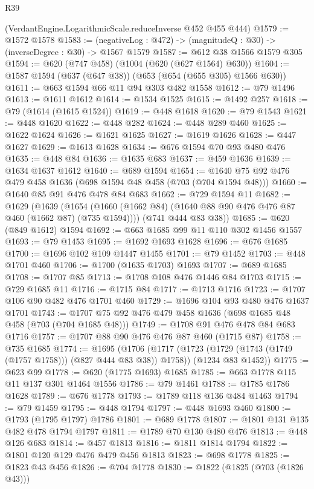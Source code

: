 \begin{lexlean}{R39}
\begin{coremodule}
    (VerdantEngine.LogarithmicScale.reduceInverse @452 @455 @444)
@1579 := @1572 @1578
@1583 := (negativeLog : @472) -> (magnitudeQ : @30) -> (inverseDegree : @30) -> @1567 @1579
@1587 := @612 @38 @1566 @1579 @305
@1594 := @620 (@747 @458) (@1004 (@620 (@627 @1564) @630))
@1604 := @1587 @1594 (@637 (@647 @38)) (@653 (@654 (@655 @305) @1566 @630))
@1611 := @663 @1594 @66 @11 @94 @303 @482 @1558
@1612 := @79 @1496
@1613 := @1611 @1612
@1614 := @1534 @1525
@1615 := @1492 @257
@1618 := @79 (@1614 (@1615 @1524))
@1619 := @448 @1618
@1620 := @79 @1543
@1621 := @448 @1620
@1622 := @448 @282
@1624 := @448 @289 @460
@1625 := @1622 @1624
@1626 := @1621 @1625
@1627 := @1619 @1626
@1628 := @447 @1627
@1629 := @1613 @1628
@1634 := @676 @1594 @70 @93 @480 @476
@1635 := @448 @84
@1636 := @1635 @683
@1637 := @459 @1636
@1639 := @1634 @1637 @1612
@1640 := @689 @1594
@1654 := @1640 @75 @92 @476 @479 @458 @1636 (@698 @1594 @48 @458 (@703 (@704 @1594 @48)))
@1660 := @1640 @85 @91 @476 @478 @84 @683
@1662 := @729 @1594 @11
@1682 := @1629
    (@1639
      (@1654 (@1660 (@1662 @84) (@1640 @88 @90 @476 @476 @87 @460 (@1662 @87) (@735 @1594))))
      (@741 @444 @83 @38))
@1685 := @620 (@849 @1612) @1594
@1692 := @663 @1685 @99 @11 @110 @302 @1456 @1557
@1693 := @79 @1453
@1695 := @1692 @1693 @1628
@1696 := @676 @1685
@1700 := @1696 @102 @109 @1447 @1455
@1701 := @79 @1452
@1703 := @448 @1701 @460
@1706 := @1700 (@1635 @1703) @1693
@1707 := @689 @1685
@1708 := @1707 @85
@1713 := @1708 @108 @476 @1446 @84 @1703
@1715 := @729 @1685 @11
@1716 := @1715 @84
@1717 := @1713 @1716
@1723 := @1707 @106 @90 @482 @476 @1701 @460
@1729 := @1696 @104 @93 @480 @476 @1637 @1701
@1743 := @1707 @75 @92 @476 @479 @458 @1636 (@698 @1685 @48 @458 (@703 (@704 @1685 @48)))
@1749 := @1708 @91 @476 @478 @84 @683 @1716
@1757 := @1707 @88 @90 @476 @476 @87 @460 (@1715 @87)
@1758 := @735 @1685
@1774 := @1695
    (@1706
      (@1717 (@1723 (@1729 (@1743 (@1749 (@1757 @1758))) (@827 @444 @83 @38)) @1758))
      (@1234 @83 @1452))
@1775 := @623 @99
@1778 := @620 (@1775 @1693) @1685
@1785 := @663 @1778 @115 @11 @137 @301 @1464 @1556
@1786 := @79 @1461
@1788 := @1785 @1786 @1628
@1789 := @676 @1778
@1793 := @1789 @118 @136 @484 @1463
@1794 := @79 @1459
@1795 := @448 @1794
@1797 := @448 @1693 @460
@1800 := @1793 (@1795 @1797) @1786
@1801 := @689 @1778
@1807 := @1801 @131 @135 @482 @478 @1794 @1797
@1811 := @1789 @70 @130 @480 @476
@1813 := @448 @126 @683
@1814 := @457 @1813
@1816 := @1811 @1814 @1794
@1822 := @1801 @120 @129 @476 @479 @456 @1813
@1823 := @698 @1778
@1825 := @1823 @43 @456
@1826 := @704 @1778
@1830 := @1822 (@1825 (@703 (@1826 @43)))

\end{coremodule}
\end{lexlean}
